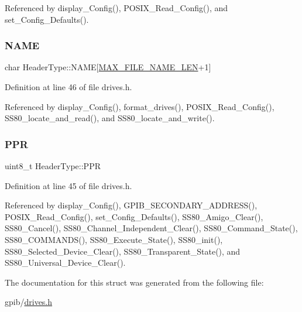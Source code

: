 Referenced by display\+\_\+\+Config(), P\+O\+S\+I\+X\+\_\+\+Read\+\_\+\+Config(), and set\+\_\+\+Config\+\_\+\+Defaults().

\mbox{\label{structHeaderType_aac997fd2dc536b10072137ecaf1fd0b4}} 
\subsubsection{\texorpdfstring{N\+A\+ME}{NAME}}
{\footnotesize\ttfamily char Header\+Type\+::\+N\+A\+ME\mbox{[}\hyperlink{drives_8h_a835262f9c26026aab5f91a528f57ad8f}{M\+A\+X\+\_\+\+F\+I\+L\+E\+\_\+\+N\+A\+M\+E\+\_\+\+L\+EN}+1\mbox{]}}



Definition at line 46 of file drives.\+h.



Referenced by display\+\_\+\+Config(), format\+\_\+drives(), P\+O\+S\+I\+X\+\_\+\+Read\+\_\+\+Config(), S\+S80\+\_\+locate\+\_\+and\+\_\+read(), and S\+S80\+\_\+locate\+\_\+and\+\_\+write().

\mbox{\label{structHeaderType_ac642cdad0f3874495afa0ab687a56fd0}} 
\subsubsection{\texorpdfstring{P\+PR}{PPR}}
{\footnotesize\ttfamily uint8\+\_\+t Header\+Type\+::\+P\+PR}



Definition at line 45 of file drives.\+h.



Referenced by display\+\_\+\+Config(), G\+P\+I\+B\+\_\+\+S\+E\+C\+O\+N\+D\+A\+R\+Y\+\_\+\+A\+D\+D\+R\+E\+S\+S(), P\+O\+S\+I\+X\+\_\+\+Read\+\_\+\+Config(), set\+\_\+\+Config\+\_\+\+Defaults(), S\+S80\+\_\+\+Amigo\+\_\+\+Clear(), S\+S80\+\_\+\+Cancel(), S\+S80\+\_\+\+Channel\+\_\+\+Independent\+\_\+\+Clear(), S\+S80\+\_\+\+Command\+\_\+\+State(), S\+S80\+\_\+\+C\+O\+M\+M\+A\+N\+D\+S(), S\+S80\+\_\+\+Execute\+\_\+\+State(), S\+S80\+\_\+init(), S\+S80\+\_\+\+Selected\+\_\+\+Device\+\_\+\+Clear(), S\+S80\+\_\+\+Transparent\+\_\+\+State(), and S\+S80\+\_\+\+Universal\+\_\+\+Device\+\_\+\+Clear().



The documentation for this struct was generated from the following file\+:\begin{DoxyCompactItemize}
\item 
gpib/\hyperlink{drives_8h}{drives.\+h}\end{DoxyCompactItemize}
